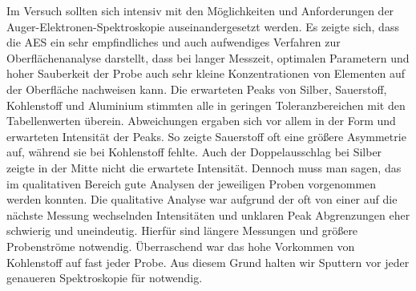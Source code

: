 Im Versuch sollten sich intensiv mit den Möglichkeiten und Anforderungen der Auger-Elektronen-Spektroskopie auseinandergesetzt werden.
Es zeigte sich, dass die AES ein sehr empfindliches und auch aufwendiges Verfahren zur Oberflächenanalyse darstellt, dass bei langer Messzeit, optimalen Parametern und hoher Sauberkeit der Probe auch sehr kleine Konzentrationen von Elementen auf der Oberfläche nachweisen kann. Die erwarteten Peaks von Silber, Sauerstoff, Kohlenstoff und Aluminium stimmten alle in geringen Toleranzbereichen mit den Tabellenwerten überein. 
Abweichungen ergaben sich vor allem in der Form und erwarteten Intensität der Peaks.
So zeigte Sauerstoff oft eine größere Asymmetrie auf, während sie bei Kohlenstoff fehlte. Auch der Doppelausschlag bei Silber zeigte in der Mitte nicht die erwartete Intensität. Dennoch muss man sagen, das im qualitativen Bereich gute Analysen der jeweiligen Proben vorgenommen werden konnten.
Die qualitative Analyse war aufgrund der oft von einer auf die nächste Messung wechselnden Intensitäten und unklaren Peak Abgrenzungen eher schwierig und uneindeutig. Hierfür sind längere Messungen und größere Probenströme notwendig.
Überraschend war das hohe Vorkommen von Kohlenstoff auf fast jeder Probe. Aus diesem Grund halten wir Sputtern vor jeder genaueren Spektroskopie für notwendig.